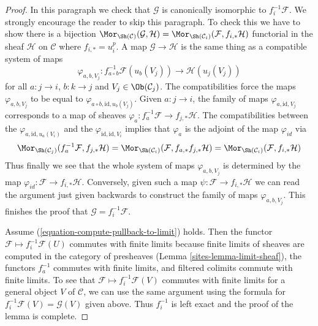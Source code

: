 \begin{proof}
\medskip\noindent
In this paragraph we check that $\mathcal{G}$ is canonically isomorphic to
$f_i^{-1}\mathcal{F}$. We strongly encourage the reader to skip this paragraph.
To check this we have to show there is a bijection
$\Mor_{\Sh(\mathcal{C})}(\mathcal{G}, \mathcal{H}) =
\Mor_{\Sh(\mathcal{C}_i)}(\mathcal{F}, f_{i, *}\mathcal{H})$
functorial in the sheaf $\mathcal{H}$ on $\mathcal{C}$
where $f_{i, *} = u_i^p$. A map
$\mathcal{G} \to \mathcal{H}$ is the same thing as a compatible
system of maps
$$
\varphi_{a, b, V_j} :
f_{a \circ b}^{-1}\mathcal{F}(u_b(V_j))
\longrightarrow
\mathcal{H}(u_j(V_j))
$$
for all $a : j \to i$, $b : k \to j$ and $V_j \in \Ob(\mathcal{C}_j)$.
The compatibilities force the maps $\varphi_{a, b, V_j}$ to be equal
to $\varphi_{a \circ b, \text{id}, u_b(V_j)}$. Given $a : j \to i$, the
family of maps $\varphi_{a, \text{id}, V_j}$ corresponds to a map
of sheaves $\varphi_a : f_a^{-1}\mathcal{F} \to f_{j, *}\mathcal{H}$.
The compatibilities between the $\varphi_{a, \text{id}, u_a(V_i)}$
and the $\varphi_{\text{id}, \text{id}, V_i}$ implies that $\varphi_a$
is the adjoint of the map $\varphi_{id}$ via
$$
\Mor_{\Sh(\mathcal{C}_j)}(f_a^{-1}\mathcal{F}, f_{j, *}\mathcal{H}) =
\Mor_{\Sh(\mathcal{C}_i)}(\mathcal{F}, f_{a, *}f_{j, *}\mathcal{H}) =
\Mor_{\Sh(\mathcal{C}_i)}(\mathcal{F}, f_{i, *}\mathcal{H})
$$
Thus finally we see that the whole system of maps $\varphi_{a, b, V_j}$
is determined by the map $\varphi_{id} : \mathcal{F} \to f_{i, *}\mathcal{H}$.
Conversely, given such a map $\psi : \mathcal{F} \to f_{i, *}\mathcal{H}$
we can read the argument just given backwards to construct the family
of maps $\varphi_{a, b, V_j}$. This finishes the proof that
$\mathcal{G} = f_i^{-1}\mathcal{F}$.

\medskip\noindent
Assume (\ref{equation-compute-pullback-to-limit}) holds. Then the functor
$\mathcal{F} \mapsto f_i^{-1}\mathcal{F}(U)$ commutes with finite limits
because finite limits of sheaves are computed in the category of presheaves
(Lemma \ref{sites-lemma-limit-sheaf}), the functors $f_a^{-1}$ commutes with finite
limits, and filtered colimits commute with finite limits. To see that
$\mathcal{F} \mapsto f_i^{-1}\mathcal{F}(V)$ commutes with finite limits
for a general object $V$ of $\mathcal{C}$, we can use the same argument using
the formula for $f_i^{-1}\mathcal{F}(V) = \mathcal{G}(V)$ given above.
Thus $f_i^{-1}$ is left exact and the proof of the lemma is complete.
\end{proof}

